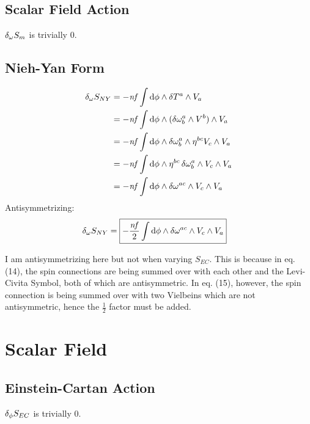 \documentclass[12pt]{article}
\begin{document}
\subsection{Scalar Field Action}
$\var_\omega{S_m}$ is trivially $0$.

\subsection{Nieh-Yan Form}
\begin{align*}
  \var_\omega{S_{NY}} &= -\mathit{nf} \int \dd{\phi} \wedge \var{T^a} \wedge V_a \\
  &= -\mathit{nf} \int \dd{\phi} \wedge (\var{\omega^a_b} \wedge V^b) \wedge V_a \\
  &= -\mathit{nf} \int \dd{\phi} \wedge \var{\omega^a_b} \wedge \eta^{bc}V_c \wedge V_a \\
  &= -\mathit{nf} \int \dd{\phi} \wedge \eta^{bc}\var{\omega^a_b} \wedge V_c \wedge V_a \\
  &= -\mathit{nf} \int \dd{\phi} \wedge \var{\omega^{ac}} \wedge V_c \wedge V_a \\
\end{align*}
Antisymmetrizing:
\begin{align}
  \var_\omega{S_{NY}} &= \boxed{-\frac{\mathit{nf}}{2} \int \dd{\phi} \wedge \var{\omega^{ac}} \wedge V_c \wedge V_a}
\end{align}

I am antisymmetrizing here but not when varying $S_{EC}$. This is because in eq. (14), the spin connections are being summed over with each other and the Levi-Civita Symbol, both of which are antisymmetric. In eq. (15), however, the spin connection is being summed over with two Vielbeins which are not antisymmetric, hence the $\frac{1}{2}$ factor must be added.

\section{Scalar Field}
\subsection{Einstein-Cartan Action}
$\var_\phi{S_{EC}}$ is trivially 0.
\end{document}
